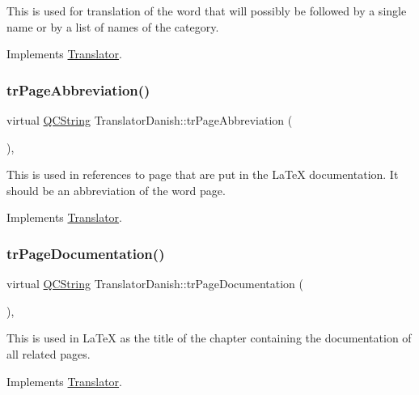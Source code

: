 This is used for translation of the word that will possibly be followed by a single name or by a list of names of the category. 

Implements \mbox{\hyperlink{class_translator}{Translator}}.

\mbox{\label{class_translator_danish_aa17e2218848b1810def3b63ea85c5ae7}} 
\subsubsection{\texorpdfstring{trPageAbbreviation()}{trPageAbbreviation()}}
{\footnotesize\ttfamily virtual \mbox{\hyperlink{class_q_c_string}{Q\+C\+String}} Translator\+Danish\+::tr\+Page\+Abbreviation (\begin{DoxyParamCaption}{ }\end{DoxyParamCaption})\hspace{0.3cm}{\ttfamily [inline]}, {\ttfamily [virtual]}}

This is used in references to page that are put in the La\+TeX documentation. It should be an abbreviation of the word page. 

Implements \mbox{\hyperlink{class_translator}{Translator}}.

\mbox{\label{class_translator_danish_a001dd1c5a4b2ac2bc56c6803cda2e80c}} 
\subsubsection{\texorpdfstring{trPageDocumentation()}{trPageDocumentation()}}
{\footnotesize\ttfamily virtual \mbox{\hyperlink{class_q_c_string}{Q\+C\+String}} Translator\+Danish\+::tr\+Page\+Documentation (\begin{DoxyParamCaption}{ }\end{DoxyParamCaption})\hspace{0.3cm}{\ttfamily [inline]}, {\ttfamily [virtual]}}

This is used in La\+TeX as the title of the chapter containing the documentation of all related pages. 

Implements \mbox{\hyperlink{class_translator}{Translator}}.

